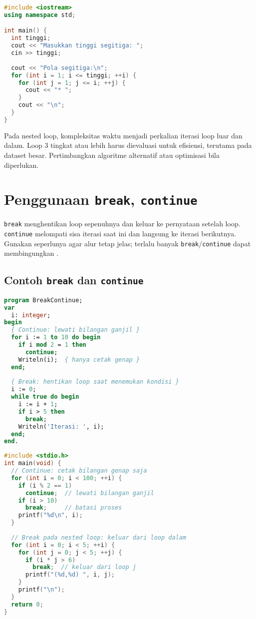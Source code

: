 \documentclass[../main.tex]{subfiles}
\begin{document}
\begin{lstlisting}[language=C++, caption={Pola bintang dengan nested loop (C++)}]
#include <iostream>
using namespace std;

int main() {
  int tinggi;
  cout << "Masukkan tinggi segitiga: ";
  cin >> tinggi;
  
  cout << "Pola segitiga:\n";
  for (int i = 1; i <= tinggi; ++i) {
    for (int j = 1; j <= i; ++j) {
      cout << "* ";
    }
    cout << "\n";
  }
}
\end{lstlisting}

Pada nested loop, kompleksitas waktu menjadi perkalian iterasi loop luar dan dalam. Loop 3 tingkat atau lebih harus dievaluasi untuk efisiensi, terutama pada dataset besar. Pertimbangkan algoritme alternatif atau optimisasi bila diperlukan.

\section{Penggunaan \texttt{break}, \texttt{continue}}
\texttt{break} menghentikan loop sepenuhnya dan keluar ke pernyataan setelah loop. \texttt{continue} melompati sisa iterasi saat ini dan langsung ke iterasi berikutnya. Gunakan seperlunya agar alur tetap jelas; terlalu banyak \texttt{break}/\texttt{continue} dapat membingungkan \parencite{gnu-c-manual,cpp-reference}.

\subsection{Contoh \texttt{break} dan \texttt{continue}}
\begin{lstlisting}[language=Pascal, caption={break dan continue di Pascal}]
program BreakContinue;
var
  i: integer;
begin
  { Continue: lewati bilangan ganjil }
  for i := 1 to 10 do begin
    if i mod 2 = 1 then
      continue;
    Writeln(i);  { hanya cetak genap }
  end;
  
  { Break: hentikan loop saat menemukan kondisi }
  i := 0;
  while true do begin
    i := i + 1;
    if i > 5 then
      break;
    Writeln('Iterasi: ', i);
  end;
end.
\end{lstlisting}

\begin{lstlisting}[language=C, caption={break dan continue di C}]
#include <stdio.h>
int main(void) {
  // Continue: cetak bilangan genap saja
  for (int i = 0; i < 100; ++i) {
    if (i % 2 == 1)
      continue;  // lewati bilangan ganjil
    if (i > 10)
      break;     // batasi proses
    printf("%d\n", i);
  }
  
  // Break pada nested loop: keluar dari loop dalam
  for (int i = 0; i < 5; ++i) {
    for (int j = 0; j < 5; ++j) {
      if (i * j > 6)
        break;  // keluar dari loop j
      printf("(%d,%d) ", i, j);
    }
    printf("\n");
  }
  return 0;
}
\end{lstlisting}
\end{document}
